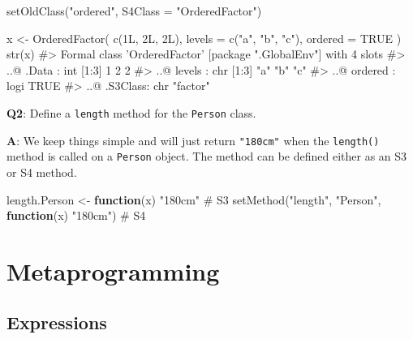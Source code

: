 \documentclass[
]{krantz}
\makeatletter
\newenvironment{Shaded}{\begin{snugshade}}{\end{snugshade}}
\newcommand{\CommentTok}[1]{\textcolor[rgb]{0.56,0.35,0.01}{\textit{#1}}}
\newcommand{\ControlFlowTok}[1]{\textcolor[rgb]{0.13,0.29,0.53}{\textbf{#1}}}
\newcommand{\DataTypeTok}[1]{\textcolor[rgb]{0.13,0.29,0.53}{#1}}
\newcommand{\KeywordTok}[1]{\textcolor[rgb]{0.13,0.29,0.53}{\textbf{#1}}}
\newcommand{\NormalTok}[1]{#1}
\newcommand{\OtherTok}[1]{\textcolor[rgb]{0.56,0.35,0.01}{#1}}
\newcommand{\StringTok}[1]{\textcolor[rgb]{0.31,0.60,0.02}{#1}}
\newenvironment{kframe}{%
\medskip{}
\setlength{\fboxsep}{.8em}
 \def\at@end@of@kframe{}%
 \ifinner\ifhmode%
  \def\at@end@of@kframe{\end{minipage}}%
  \begin{minipage}{\columnwidth}%
 \fi\fi%
 \def\FrameCommand##1{\hskip\@totalleftmargin \hskip-\fboxsep
 \colorbox{shadecolor}{##1}\hskip-\fboxsep
     \hskip-\linewidth \hskip-\@totalleftmargin \hskip\columnwidth}%
 \MakeFramed {\advance\hsize-\width
   \@totalleftmargin\z@ \linewidth\hsize
   \@setminipage}}%
 {\par\unskip\endMakeFramed%
 \at@end@of@kframe}
\renewenvironment{Shaded}{\begin{kframe}}{\end{kframe}}
\renewcommand{\KeywordTok} [1]{\textcolor[rgb]{0.00,0.44,0.13}{{#1}}}
\renewcommand{\DataTypeTok}[1]{\textcolor[rgb]{0.56,0.13,0.00}{{#1}}}
\renewcommand{\StringTok}  [1]{\textcolor[rgb]{0.25,0.44,0.63}{{#1}}}
\renewcommand{\CommentTok} [1]{\textcolor[rgb]{0.38,0.63,0.69}{{#1}}}
\renewcommand{\OtherTok}   [1]{\textcolor[rgb]{0.00,0.44,0.13}{{#1}}}
\renewcommand{\NormalTok}  [1]{{#1}}
\makeatother
\begin{document}
\begin{Shaded}
\begin{Highlighting}[]
\KeywordTok{setOldClass}\NormalTok{(}\StringTok{"ordered"}\NormalTok{, }\DataTypeTok{S4Class =} \StringTok{"OrderedFactor"}\NormalTok{)}

\NormalTok{x <-}\StringTok{ }\KeywordTok{OrderedFactor}\NormalTok{(}
  \KeywordTok{c}\NormalTok{(1L, 2L, 2L),}
  \DataTypeTok{levels =} \KeywordTok{c}\NormalTok{(}\StringTok{"a"}\NormalTok{, }\StringTok{"b"}\NormalTok{, }\StringTok{"c"}\NormalTok{),}
  \DataTypeTok{ordered =} \OtherTok{TRUE}
\NormalTok{)}
\KeywordTok{str}\NormalTok{(x)}
\CommentTok{#> Formal class 'OrderedFactor' [package ".GlobalEnv"] with 4 slots}
\CommentTok{#>   ..@ .Data   : int [1:3] 1 2 2}
\CommentTok{#>   ..@ levels  : chr [1:3] "a" "b" "c"}
\CommentTok{#>   ..@ ordered : logi TRUE}
\CommentTok{#>   ..@ .S3Class: chr "factor"}
\end{Highlighting}
\end{Shaded}

\textbf{{Q2}}: Define a \texttt{length} method for the \texttt{Person} class.

\textbf{{A}}: We keep things simple and will just return \texttt{"180cm"} when the \texttt{length()} method is called on a \texttt{Person} object. The method can be defined either as an S3 or S4 method.

\begin{Shaded}
\begin{Highlighting}[]
\NormalTok{length.Person <-}\StringTok{ }\ControlFlowTok{function}\NormalTok{(x) }\StringTok{"180cm"}  \CommentTok{# S3}
\KeywordTok{setMethod}\NormalTok{(}\StringTok{"length"}\NormalTok{, }\StringTok{"Person"}\NormalTok{, }\ControlFlowTok{function}\NormalTok{(x) }\StringTok{"180cm"}\NormalTok{)  }\CommentTok{# S4}
\end{Highlighting}
\end{Shaded}

\hypertarget{part-metaprogramming}{%
\part{Metaprogramming}\label{part-metaprogramming}}


\hypertarget{expressions}{%
\chapter{Expressions}\label{expressions}}
\end{document}
